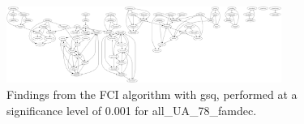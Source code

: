 \begin{figure}[htbp]
    \centering
    \includegraphics[width=0.8\textwidth]{Report/final_report/pictures/FCI_gsq_0.001_all_UA_78_famdec.png}
    \caption{Findings from the FCI algorithm with gsq, performed at a significance level of 0.001 for all_UA_78_famdec.}
    \label{fig:fci_gsq_0.001all_UA_78_famdec}
\end{figure}
